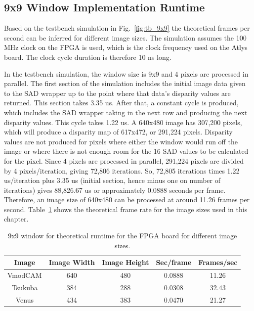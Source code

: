 \subsection{9x9 Window Implementation Runtime}
\label{sec:testbench9x9}

Based on the testbench simulation in Fig.~\ref{fig:tb_9x9} the theoretical frames per second can be inferred for different image sizes. The simulation assumes the 100 MHz clock on the FPGA is used, which is the clock frequency used on the Atlys board. The clock cycle duration is therefore 10 ns long.

In the testbench simulation, the window size is 9x9 and 4 pixels are processed in parallel. The first section of the simulation includes the initial image data given to the SAD wrapper up to the point where that data's disparity values are returned. This section takes 3.35 us. After that, a constant cycle is produced, which includes the SAD wrapper taking in the next row and producing the next disparity values. This cycle takes 1.22 us. A 640x480 image has 307,200 pixels, which will produce a disparity map of 617x472, or 291,224 pixels. Disparity values are not produced for pixels where either the window would run off the image or where there is not enough room for the 16 SAD values to be calculated for the pixel. Since 4 pixels are processed in parallel, 291,224 pixels are divided by 4 pixels/iteration, giving 72,806 iterations. So, 72,805 iterations times 1.22 us/iteration plus 3.35 us (initial section, hence minus one on number of iterations) gives 88,826.67 us or approximately 0.0888 seconds per frame. Therefore, an image size of 640x480 can be processed at around 11.26 frames per second. Table~\ref{table:tb_9x9} shows the theoretical frame rate for the image sizes used in this chapter.

\begin{table}
	\begin{center}
		\begin{tabular}{|c|c|c|c|c|}
			\hline 
				\rowstyle{\bfseries} Image & 
				\rowstyle{\bfseries} Image Width & 
				\rowstyle{\bfseries} Image Height & 
				\rowstyle{\bfseries} Sec/frame & 
				\rowstyle{\bfseries} Frames/sec
			\tabularnewline
			\hline 
			VmodCAM & 640 & 480 & 0.0888 & 11.26
			\tabularnewline
			\hline 
			Tsukuba & 384 & 288 & 0.0308 & 32.43
			\tabularnewline
			\hline 
			Venus & 434 & 383 & 0.0470 & 21.27
			\tabularnewline
			\hline 			
			\end{tabular}
		\captionfonts
		\caption{9x9 window for theoretical runtime for the FPGA board for different image sizes.}
		\label{table:tb_9x9}
	\end{center}
\end{table}

